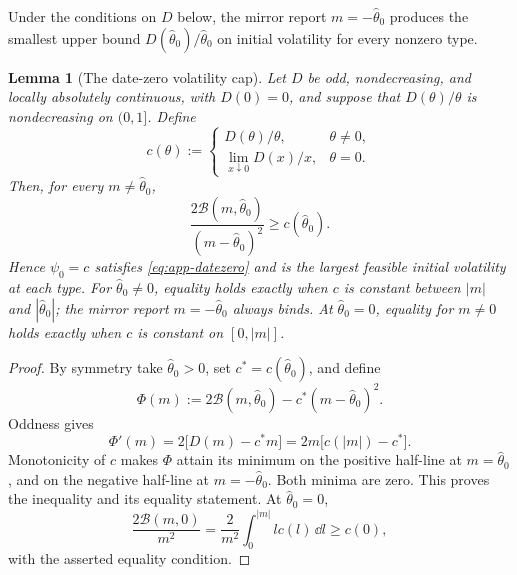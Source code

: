 \documentclass[12pt]{article}
\newtheorem{lemma}{Lemma}
\newcommand{\hth}{\hat\theta}
\begin{document}
Under the conditions on \(D\) below, the mirror report
\(m=-\hth_0\) produces the smallest upper bound \(D(\hth_0)/\hth_0\) on initial volatility
for every nonzero type.

\begin{lemma}[The date-zero volatility cap]\label{lem:app-star}
Let \(D\) be odd, nondecreasing, and locally absolutely continuous, with
\(D(0)=0\), and suppose that \(D(\theta)/\theta\) is nondecreasing on
\((0,1]\). Define
\[
  c(\theta):=
  \begin{cases}
    D(\theta)/\theta,&\theta\ne0,\\[2pt]
    \displaystyle\lim_{x\downarrow0}D(x)/x,&\theta=0.
  \end{cases}
\]
Then, for every \(m\ne\hth_0\),
\[
  \frac{2\mathcal B(m,\hth_0)}{(m-\hth_0)^2}
  \geq c(\hth_0).
\]
Hence \(\psi_0=c\) satisfies \eqref{eq:app-datezero} and is the
largest feasible initial volatility at each type. For \(\hth_0\ne0\),
equality holds exactly when \(c\) is constant between
\(|m|\) and \(|\hth_0|\); the mirror report
\(m=-\hth_0\) always binds. At \(\hth_0=0\), equality for \(m\ne0\)
holds exactly when \(c\) is constant on \([0,|m|]\).
\end{lemma}
\begin{proof}
By symmetry take \(\hth_0>0\), set \(c^*=c(\hth_0)\), and define
\[
  \Phi(m):=2\mathcal B(m,\hth_0)-c^*(m-\hth_0)^2.
\]
Oddness gives
\[
  \Phi'(m)=2\bigl[D(m)-c^*m\bigr]
  =2m\bigl[c(|m|)-c^*\bigr].
\]
Monotonicity of \(c\) makes \(\Phi\) attain its minimum on the positive
half-line at \(m=\hth_0\), and on the negative half-line at
\(m=-\hth_0\). Both minima are zero. This proves the inequality and its
equality statement. At \(\hth_0=0\),
\[
  \frac{2\mathcal B(m,0)}{m^2}
  =\frac{2}{m^2}\int_0^{|m|}l c(l)\,\dd l\geq c(0),
\]
with the asserted equality condition.
\end{proof}
\end{document}
